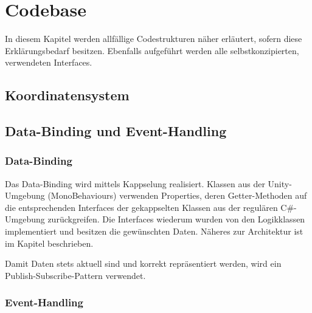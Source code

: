 \documentclass[../main.tex]{subfiles}
\begin{document}

	\section{Codebase}
	\par In diesem Kapitel werden allfällige Codestrukturen näher erläutert, sofern diese Erklärungsbedarf besitzen. Ebenfalls aufgeführt werden alle selbstkonzipierten, verwendeten Interfaces.
	\subsection{Koordinatensystem}
	
	\subsection{Data-Binding und Event-Handling}
	\subsubsection{Data-Binding}
	\par Das Data-Binding wird mittels Kappselung realisiert. Klassen aus der Unity-Umgebung (MonoBehaviours) verwenden Properties, deren Getter-Methoden auf die entsprechenden Interfaces der gekappselten Klassen aus der regulären C\#-Umgebung zurückgreifen. Die Interfaces wiederum wurden von den Logikklassen implementiert und besitzen die gewünschten Daten. Näheres zur Architektur ist im Kapitel  beschrieben.
	\par Damit Daten stets aktuell sind und korrekt repräsentiert werden, wird ein Publish-Subscribe-Pattern verwendet.
	\subsubsection{Event-Handling}
	
\end{document}
